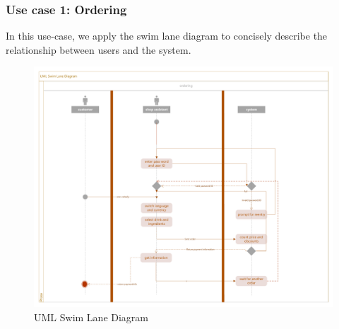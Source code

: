 \documentclass[a4paper]{report}
\begin{document}
\subsubsection{Use case 1: Ordering}
In this use-case, we apply the swim lane diagram to concisely describe the relationship between users and the system.
\begin{figure}
  \centering
  \includegraphics[scale=0.33]{SwimLane.pdf}
  \caption{UML Swim Lane Diagram}\label{2}
\end{figure}
\end{document}
